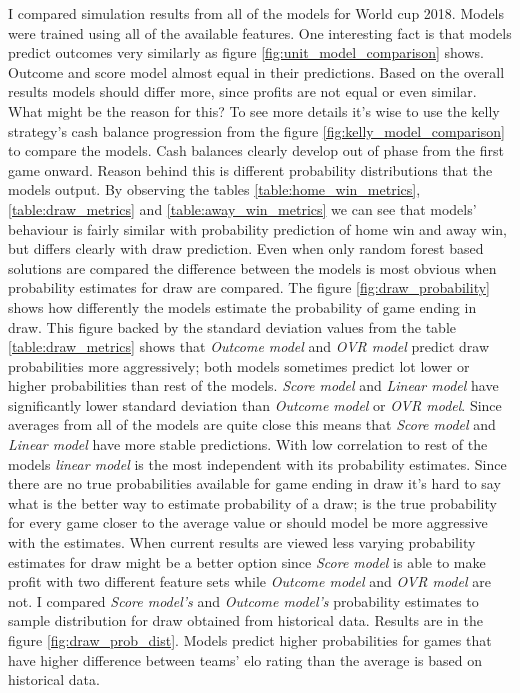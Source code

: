 I compared simulation results from all of the models for World cup 2018. Models were trained using all of the available features. One interesting fact is that models predict outcomes very similarly as figure \ref{fig:unit_model_comparison} shows. Outcome and score model almost equal in their predictions. Based on the overall results models should differ more, since profits are not equal or even similar. What might be the reason for this? To see more details it's wise to use the kelly strategy's cash balance progression from the figure \ref{fig:kelly_model_comparison} to compare the models. Cash balances clearly develop out of phase from the first game onward. Reason behind this is different probability distributions that the models output. By observing the tables \ref{table:home_win_metrics}, \ref{table:draw_metrics} and \ref{table:away_win_metrics} we can see that models' behaviour is fairly similar with probability prediction of home win and away win, but differs clearly with draw prediction. Even when only random forest based solutions are compared the difference between the models is most obvious when probability estimates for draw are compared. The figure \ref{fig:draw_probability} shows how differently the models estimate the probability of game ending in draw. This figure backed by the standard deviation values from the table \ref{table:draw_metrics} shows that \textit{Outcome model} and \textit{OVR model} predict draw probabilities more aggressively; both models sometimes predict lot lower or higher probabilities than rest of the models. \textit{Score model} and \textit{Linear model} have significantly lower standard deviation than \textit{Outcome model} or \textit{OVR model}. Since averages from all of the models are quite close this means that \textit{Score model} and \textit{Linear model} have more stable predictions. With low correlation to rest of the models \textit{linear model} is the most independent with its probability estimates. Since there are no true probabilities available for game ending in draw it's hard to say what is the better way to estimate probability of a draw; is the true probability for every game closer to the average value or should model be more aggressive with the estimates. When current results are viewed less varying probability estimates for draw might be a better option since \textit{Score model} is able to make profit with two different feature sets while \textit{Outcome model} and \textit{OVR model} are not. I compared \textit{Score model's} and \textit{Outcome model's} probability estimates to sample distribution for draw obtained from historical data. Results are in the figure \ref{fig:draw_prob_dist}. Models predict higher probabilities for games that have higher difference between teams' elo rating than the average is based on historical data.


